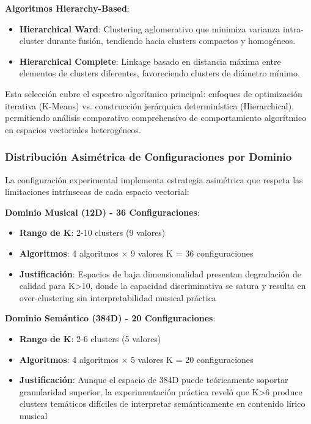 \documentclass[12pt,a4paper]{report}
\begin{document}
\textbf{Algoritmos Hierarchy-Based}:
\begin{itemize}
\item \textbf{Hierarchical Ward}: Clustering aglomerativo que minimiza varianza intra-cluster durante fusión, tendiendo hacia clusters compactos y homogéneos.
\item \textbf{Hierarchical Complete}: Linkage basado en distancia máxima entre elementos de clusters diferentes, favoreciendo clusters de diámetro mínimo.
\end{itemize}

Esta selección cubre el espectro algorítmico principal: enfoques de optimización iterativa (K-Means) vs. construcción jerárquica determinística (Hierarchical), permitiendo análisis comparativo comprehensivo de comportamiento algorítmico en espacios vectoriales heterogéneos.

\subsubsection{Distribución Asimétrica de Configuraciones por Dominio}

La configuración experimental implementa estrategia asimétrica que respeta las limitaciones intrínsecas de cada espacio vectorial:

\textbf{Dominio Musical (12D) - 36 Configuraciones}:
\begin{itemize}
\item \textbf{Rango de K}: 2-10 clusters (9 valores)
\item \textbf{Algoritmos}: 4 algoritmos × 9 valores K = 36 configuraciones
\item \textbf{Justificación}: Espacios de baja dimensionalidad presentan degradación de calidad para K>10, donde la capacidad discriminativa se satura y resulta en over-clustering sin interpretabilidad musical práctica
\end{itemize}

\textbf{Dominio Semántico (384D) - 20 Configuraciones}:
\begin{itemize}
\item \textbf{Rango de K}: 2-6 clusters (5 valores)
\item \textbf{Algoritmos}: 4 algoritmos × 5 valores K = 20 configuraciones
\item \textbf{Justificación}: Aunque el espacio de 384D puede teóricamente soportar granularidad superior, la experimentación práctica reveló que K>6 produce clusters temáticos difíciles de interpretar semánticamente en contenido lírico musical
\end{itemize}
\end{document}
